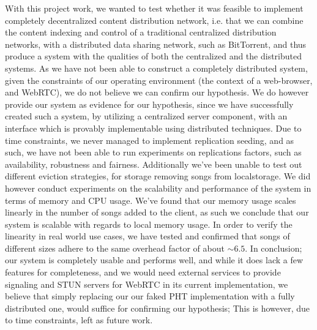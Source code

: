 With this project work, we wanted to test whether it was feasible to implement
completely decentralized content distribution network, i.e. that we can combine
the content indexing and control of a traditional centralized distribution networks, 
with a distributed data sharing network, such as BitTorrent, 
and thus produce a system
with the qualities of both the centralized and the distributed systems.
\newline\newline
As we have not been able to construct a completely distributed system,
given the constraints of our operating environment
(the context of a web-browser, and WebRTC),
we do not believe we can confirm our hypothesis.
We do however provide our system as evidence for our hypothesis, since we have
successfully created such a system, by utilizing a centralized server component,
with an interface which is provably implementable using distributed techniques.
\newline\newline
Due to time constraints, 
we never managed to implement replication seeding, 
and as such,
we have not been able to run experiments on replications factors,
such as availability, robustness and fairness.
Additionally we've been unable to test out different eviction strategies,
for storage removing songs from localstorage.
\newline\newline
We did however conduct experiments on the scalability and performance of the 
system in terms of memory and CPU usage.
We've found that our memory usage scales linearly in the number of songs added
to the client, as such we conclude that our system is scalable with regards to
local memory usage. In order to verify the linearity in real world use cases,
we have tested and confirmed that songs of different sizes adhere to the same
overhead factor of about $\sim6.5$.
\newline\newline
In conclusion; our system is completely usable and performs well,
and while it does lack a few features for completeness,
and we would need external services to provide signaling and STUN servers for WebRTC
in its current implementation,
we believe that simply replacing our our faked \acs{PHT}
implementation with a fully distributed one,
would suffice for confirming our hypothesis;
This is however, due to time constraints, left as future work.
